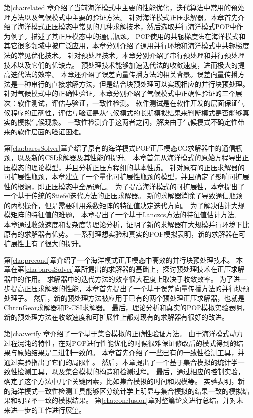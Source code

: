 第\ref{cha:related}章介绍了当前海洋模式中主要的性能优化，迭代算法中常用的预处理方法以及气候模式中主要的验证方法。
针对海洋模式正压求解器，本章首先介绍了海洋模式正压模态中常见的几种求解技术，然后选取并行海洋模式POP中作为例子，描述了其正压模态中的通信瓶颈。 
POP使用的共轭梯度法在海洋模式和其它很多领域中被广泛应用，本章分别介绍了通用并行环境和海洋模式中共轭梯度法的常见优化技术。
针对预处理技术，本章分别介绍了串行预处理和并行预处理技术以及它们的优缺点。
预处理技术能够加速迭代法的收敛速度，进而极大的提高迭代法的效率。
本章还介绍了误差向量传播方法的相关背景。误差向量传播方法是一种串行的直接求解方法，但是结合块预处理可以实现相应的并行块预处理。
针对气候模式中的正确性验证，本章分别介绍了气候模式中正确性验证的三个层次：软件测试，评估与验证，一致性检测。
软件测试是在软件开发的层面保证气候程序的正确性，评估与验证是从气候模式的长期模拟结果来判断模式是否能够真实的模拟气候现象。
一致性检测介于这两者之间，解决由于气候模式不确定性带来的软件层面的验证困难。


第\ref{cha:barosSolver}章介绍了原有的海洋模式POP正压模态CG求解器中的通信瓶颈，以及新的CSI求解器及其性能的提升。 
本章首先从海洋模式的原始方程导出正压模态的理论模型，并且分析正压方程组的基本性质。
针对原有的正压求解器的可扩展性瓶颈，本章建立了一个量化可扩展性瓶颈的模型，并且确定了影响可扩展性的根源，即正压模态中全局通信。
为了提高海洋模式的可扩展性，本章提出了一个基于传统的Stiefel迭代方法的正压求解器。 
新的求解器消除了导致通信瓶颈的內积操作，但是需要利用系数矩阵的特征值决定迭代方向。 
为了解决估计大规模矩阵的特征值的难题， 本章提出了一个基于Lanczos方法的特征值估计方法。 
本章通过收敛速度和复杂度等理论分析，证明了新的求解器在大规模并行环境下比原有的求解器有优势。
一系列理想实验和真实的POP模拟表明，新的求解器在可扩展性上有了很大的提升。 



第\ref{cha:precond}章介绍了一个海洋模式正压模态中高效的并行块预处理技术。
本章在第\ref{cha:barosSolver}章所提出的求解器的基础上，探讨预处理技术在正压求解器中的作用。
求解器中的迭代方法的效率很大程度上取决于收敛效率。
为了进一步提高正压求解器的性能，本章首先提出了一个基于误差向量传播方法的并行块预处理子。
然后，新的预处理方法被应用于已有的两个预处理正压求解器，也就是ChronGear求解器和P-CSI求解器。
最后，理论分析和真实的POP模拟实验表明，新的预处理方法在收敛速度和可扩展性上都对现有的求解器有很好的改进。

第\ref{cha:verify}章介绍了一个基于集合模拟的正确性验证方法。  
由于海洋模式动力过程混沌的特性，在对POP进行性能优化的时候很难保证修改后的模式得到的结果与原始结果是二进制一致的。 
本章首先介绍了一些已有的一致性检测工具，并通过实验指出了它们的局限性。
然后，本章提出了一个基于集合模拟的统计学一致性检测工具，以及集合模拟的构造和检测过程。
最后，通过相应的控制实验，确定了这个方法中几个关键因素，比如集合模拟的时间和规模等。
实验表明，新的海洋模式一致性检测工具能够区分统计学上明显与集合模拟的结果一致的模拟结果和明显不一致的模拟结果。 
第\ref{cha:conclusion}章对整篇论文进行总结，并对未来进一步的工作进行展望。


